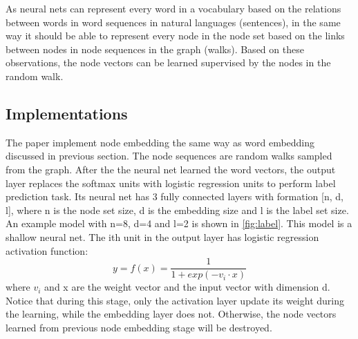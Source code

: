 \documentclass{article}
\begin{document}
As neural nets can represent every word in a vocabulary based on the relations between words in word sequences in natural languages (sentences), in the same way it should be able to represent every node in the node set based on the links between nodes in node sequences in the graph (walks). Based on these observations, the node vectors can be learned supervised by the nodes in the random walk.

\subsection{Implementations}
The paper implement node embedding the same way as word embedding discussed in previous section. The node sequences are random walks sampled from the graph. After the the neural net learned the word vectors, the output layer replaces the softmax units with logistic regression units to perform label prediction task. Its neural net has 3 fully connected layers with formation [n, d, l], where n is the node set size, d is the embedding size and l is the label set size. An example model with n=8, d=4 and l=2 is shown in \autoref{fig:label}. This model is a shallow neural net. The ith unit in the output layer has logistic regression activation function:
\begin{equation}
y = f(x) = \frac{1}{1 + exp(-v_i \cdot x)}
\end{equation}
where $ v_i $ and x are the weight vector and the input vector with dimension d. Notice that during this stage, only the activation layer update its weight during the learning, while the embedding layer does not. Otherwise, the node vectors learned from previous node embedding stage will be destroyed.
\end{document}
